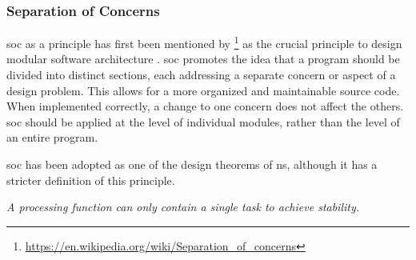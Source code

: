 \subsubsection*{Separation of Concerns}

\gls{soc} as a principle has first been mentioned by
\citeauthor{dijkstra_selected_1982}\footnote{\url{https://en.wikipedia.org/wiki/Separation_of_concerns}}
as the crucial principle to design modular software architecture
\parencite[]{dijkstra_selected_1982}. \gls{soc} promotes the idea that a program should be
divided into distinct sections, each addressing a separate concern or aspect of a design
problem. This allows for a more organized and maintainable source code. When implemented
correctly, a change to one concern does not affect the others. \gls{soc} should be applied
at the level of individual modules, rather than the level of an entire program.

\gls{soc} has been adopted as one of the design theorems of \gls{ns}, although it has a
stricter definition of this principle\parencite{mannaert_normalized_2016}.

\begin{tcolorbox}[boxrule=0.1pt, colback=mygray, title=Theorem I,colbacktitle=gray]
    \textit{A processing function can only contain a single task to achieve stability.}
\end{tcolorbox}